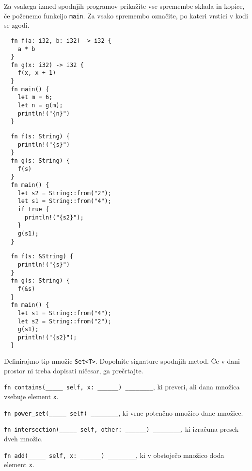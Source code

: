 \documentclass[arhiv]{izpit}
\begin{document}


\naloga[\tocke{10}]

Za vsakega izmed spodnjih programov prikažite vse spremembe sklada in kopice, če poženemo funkcijo \texttt{main}. Za vsako spremembo označite, po kateri vrstici v kodi se zgodi.

\podnaloga
\begin{verbatim}
  fn f(a: i32, b: i32) -> i32 {
    a * b
  }
  fn g(x: i32) -> i32 {
    f(x, x + 1)
  }
  fn main() {
    let m = 6;
    let n = g(m);
    println!("{n}")
  }
\end{verbatim}

\podnaloga
\begin{verbatim}
  fn f(s: String) {
    println!("{s}")
  }
  fn g(s: String) {
    f(s)
  }
  fn main() {
    let s2 = String::from("2");
    let s1 = String::from("4");
    if true {
      println!("{s2}");
    }
    g(s1);
  }
\end{verbatim}

\podnaloga
\begin{verbatim}
  fn f(s: &String) {
    println!("{s}")
  }
  fn g(s: String) {
    f(&s)
  }
  fn main() {
    let s1 = String::from("4");
    let s2 = String::from("2");
    g(s1);
    println!("{s2}");
  }
\end{verbatim}



\naloga[\tocke{10}]

Definirajmo tip množic \texttt{Set<T>}. Dopolnite signature spodnjih metod. Če v dani prostor ni treba dopisati ničesar, ga prečrtajte.

\podnaloga
\texttt{fn contains(_____ self, x: ______) ________}, ki preveri, ali dana množica vsebuje element \texttt{x}.

\podnaloga
\texttt{fn power_set(_____ self) ________}, ki vrne potenčno množico dane množice.

\podnaloga
\texttt{fn intersection(_____ self, other: ______) ________}, ki izračuna presek dveh množic.

\podnaloga
\texttt{fn add(_____ self, x: ______) ________}, ki v obstoječo množico doda element \texttt{x}.
\end{document}
